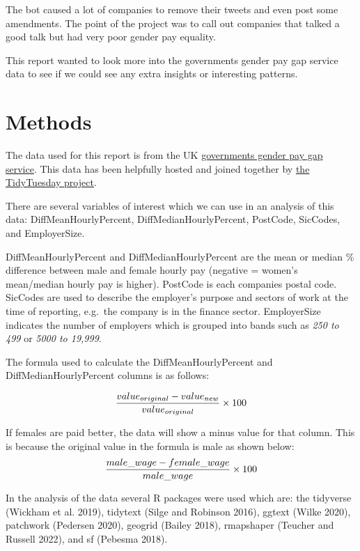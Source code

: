 \documentclass[
  11pt,
  letterpaper,
  DIV=11,
  numbers=noendperiod]{scrartcl}
\begin{document}
The bot caused a lot of companies to remove their tweets and even post
some amendments. The point of the project was to call out companies that
talked a good talk but had very poor gender pay equality.

This report wanted to look more into the governments gender pay gap
service data to see if we could see any extra insights or interesting
patterns.

\newpage

\section{Methods}\label{methods}

The data used for this report is from the UK
\href{https://gender-pay-gap.service.gov.uk/}{governments gender pay gap
service}. This data has been helpfully hosted and joined together by
\href{https://github.com/rfordatascience/tidytuesday/tree/master/data/2022/2022-06-28}{the
TidyTuesday project}.

There are several variables of interest which we can use in an analysis
of this data: DiffMeanHourlyPercent, DiffMedianHourlyPercent, PostCode,
SicCodes, and EmployerSize.

DiffMeanHourlyPercent and DiffMedianHourlyPercent are the mean or median
\% difference between male and female hourly pay (negative = women's
mean/median hourly pay is higher). PostCode is each companies postal
code. SicCodes are used to describe the employer's purpose and sectors
of work at the time of reporting, e.g.~the company is in the finance
sector. EmployerSize indicates the number of employers which is grouped
into bands such as \emph{250 to 499} or \emph{5000 to 19,999}.

The formula used to calculate the DiffMeanHourlyPercent and
DiffMedianHourlyPercent columns is as follows:

\[ {{value_{original} - value_{new}} \over {value_{original}}} \times 100 \]

If females are paid better, the data will show a minus value for that
column. This is because the original value in the formula is male as
shown below:
\[ {{male\_wage - female\_wage \over male\_wage}} \times 100 \]

In the analysis of the data several R packages were used which are: the
tidyverse (Wickham et al. 2019), tidytext (Silge and Robinson 2016),
ggtext (Wilke 2020), patchwork (Pedersen 2020), geogrid (Bailey 2018),
rmapshaper (Teucher and Russell 2022), and sf (Pebesma 2018).
\end{document}
